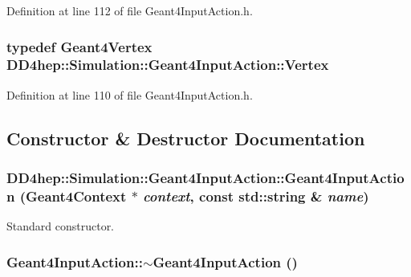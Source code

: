 Definition at line 112 of file Geant4InputAction.h.\hypertarget{class_d_d4hep_1_1_simulation_1_1_geant4_input_action_a0bcc23935dc55574b02d9ee4514eabc8}{
\subsubsection[{Vertex}]{\setlength{\rightskip}{0pt plus 5cm}typedef {\bf Geant4Vertex} {\bf DD4hep::Simulation::Geant4InputAction::Vertex}}}
\label{class_d_d4hep_1_1_simulation_1_1_geant4_input_action_a0bcc23935dc55574b02d9ee4514eabc8}


Definition at line 110 of file Geant4InputAction.h.

\subsection{Constructor \& Destructor Documentation}
\hypertarget{class_d_d4hep_1_1_simulation_1_1_geant4_input_action_a01a47921dd4a3a2d2c56fb108cbb7d6f}{
\subsubsection[{Geant4InputAction}]{\setlength{\rightskip}{0pt plus 5cm}DD4hep::Simulation::Geant4InputAction::Geant4InputAction ({\bf Geant4Context} $\ast$ {\em context}, \/  const std::string \& {\em name})}}
\label{class_d_d4hep_1_1_simulation_1_1_geant4_input_action_a01a47921dd4a3a2d2c56fb108cbb7d6f}


Standard constructor. \hypertarget{class_d_d4hep_1_1_simulation_1_1_geant4_input_action_a82b07efc96d11b7dfacb36c718d41c26}{
\subsubsection[{$\sim$Geant4InputAction}]{\setlength{\rightskip}{0pt plus 5cm}Geant4InputAction::$\sim$Geant4InputAction ()}}
\label{class_d_d4hep_1_1_simulation_1_1_geant4_input_action_a82b07efc96d11b7dfacb36c718d41c26}


